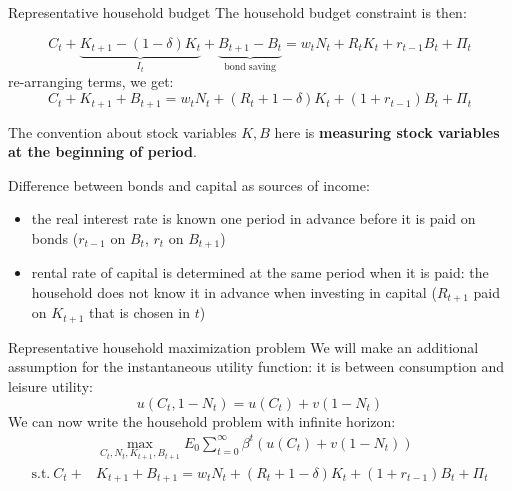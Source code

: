 \documentclass{beamer}
\newcommand{\tb}[1]{{\color{blue}{\textbf{#1}}}}
\begin{document}
\begin{frame}{Representative household budget}
The household budget constraint is then:

$$
C_t+\underbrace{K_{t+1}-(1-\delta) K_t}_{I_t}+\underbrace{B_{t+1}-B_t}_{\text{bond saving}}=w_t N_t+R_t K_t+r_{t-1} B_t+\Pi_t
$$
re-arranging terms, we get:
$$
C_t+K_{t+1}+B_{t+1}=w_t N_t+(R_t+1-\delta) K_t +(1+r_{t-1}) B_t+\Pi_t
$$

The convention about stock variables $K, B$ here is \textbf{measuring stock variables at the beginning of period}. 

Difference between bonds and capital as sources of income: 
\begin{itemize}
    \item  the real interest rate is known one period in advance before it is paid on bonds ($r_{t-1}$ on $B_t$, $r_t$ on $B_{t+1}$)
    \item rental rate of capital is determined at the same period when it is paid: the household does not know it in advance when investing in capital ($R_{t+1}$ paid on $K_{t+1}$ that is chosen in $t$)
\end{itemize}

\end{frame}

\begin{frame}{Representative household maximization problem}
    We will make an additional assumption for the instantaneous utility function: it is \tb{additively separable} between consumption and leisure utility:
    $$u(C_t, 1-N_t) = u(C_t)+v(1-N_t)$$
    We can now write the household problem with infinite horizon:
   \begin{align*}
&\max _{C_t, N_t, K_{t+1}, B_{t+1}} E_0 \sum_{t=0}^{\infty} \beta^t\left(u\left(C_t\right)+v\left(1-N_t\right)\right) \\
\text{s.t.}\ C_t+&K_{t+1}+B_{t+1}=w_t N_t+(R_t+1-\delta) K_t +(1+r_{t-1}) B_t+\Pi_t
\end{align*}
\end{frame}

\end{document}
